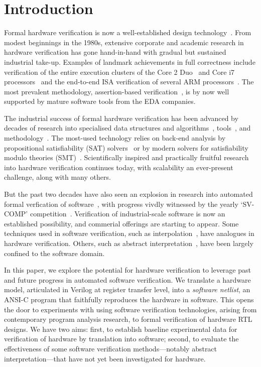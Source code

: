 \section{Introduction}\label{sec:intro}
%
Formal hardware verification is now a well-established design technology~\cite{Seligman:2015:FV}. From modest beginnings in the 1980s, extensive corporate and academic research in hardware verification has gone hand-in-hand with gradual but sustained industrial take-up. Examples of landmark achievements in full correctness include verification of the entire execution clusters of the Core 2 Duo~\cite{Core2}  and Core i7 processors~\cite{i7} and the end-to-end ISA verification of several ARM processors~\cite{ARM}. The most prevalent methodology, assertion-based verification~\cite{Foster:2009:AAB}, is by now well supported by mature software tools from the EDA companies.

The industrial success of formal hardware verification has been advanced by decades of research into specialised data structures and algorithms~\cite{ic3,fmcad2000,ken,biere,STE}, tools~\cite{Seger:2005:IEE,abc,ebmc,vis,cadence,synopsysfv}, and methodology~\cite{MCMILLAN2000279,Aagaard:2000:MLH,uclid,word-term,word-bmc,DBLP:conf/lpar/AndrausLS08}.  The most-used technology relies on back-end analysis by propositional satisfiability (SAT) solvers~\cite{Biere1999} or by modern solvers for satisfiability modulo theories (SMT)~\cite{decision_procedures, DBLP:conf/lpar/AndrausLS08,soc-keating,
DBLP:conf/mtv/SunkariCVM07,DBLP:conf/cav/Bjesse08}. Scientifically inspired and practically fruitful research into hardware verification continues today, with scalability an ever-present challenge, along with many others. 

But the past two decades have also seen an explosion in research into automated formal verfication of software~\cite{dkw2008}, with progress vivdly witnessed by the yearly `SV-COMP' competition~\cite{Beyer2017}.  Verification of industrial-scale software is now an established possibility, and commerial offerings are starting to appear. Some techniques used in software verification, such as interpolation~\cite{Interpolants,Kroening:2011:ISV}, have analogues in hardware verification. Others, such as abstract interpretation~\cite{CousotCousot77,Cousot:1996:AI}, have been largely confined to the software domain.  

In this paper, we explore the potential for hardware verification to leverage past and future progress in automated software verification. We translate a hardware model, articulated in Verilog at register transfer level, into a \emph{software netlist}, an ANSI-C program that faithfully reproduces the hardware in software. This opens the door to experiments with using software verification technologies, arising from contemporary program analysis research, to formal verification of hardware RTL designs. We have two aims: first, to establish baseline experimental data for verification of hardware by translation into software; second, to evaluate the effectiveness of some software verification methods---notably abstract interpretation---that have not yet been investigated for hardware.


